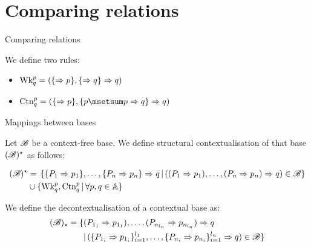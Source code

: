 \documentclass{beamer}
\begin{document}
\section{Comparing relations}
\begin{frame}{Comparing relations}
\begin{definition}
	We define two rules:
	\begin{itemize}
		\item $\text{Wk}^p_q = (\openaddrule \Rightarrow p\closeaddrule, \openaddrule \Rightarrow q \closeaddrule\Rightarrow q)$
		\item $\text{Ctn}^p_q = (\openaddrule \Rightarrow p \closeaddrule, \openaddrule p\msetsum p\Rightarrow q\closeaddrule\Rightarrow q)$
	\end{itemize}
\end{definition}
\end{frame}
\begin{frame}{Mappings between bases}
	\pause
	\begin{definition}
		Let $\baseB$ be a context-free base. We define structural contextualisation of that base $\iplill{\baseB}$ as follows: 
		\begin{minipage}{\textwidth}\scriptsize
		\begin{align*}
		\iplill{\baseB} &= \,\{ \openaddrule P_1\Rightarrow p_1\closeaddrule, \dots, \openaddrule P_n\Rightarrow p_n\closeaddrule\Rightarrow q \, | \, ((P_1\Rightarrow p_1), \dots, (P_n\Rightarrow p_n)\Rightarrow q) \in\baseB \}\\ 
		& \cup \{\text{Wk}^p_q, \text{Ctn}^p_q \,|\, \forall p, q \in \At\}
		\end{align*}
	\end{minipage}
	\end{definition}
	\pause
	We define the decontextualisation of a contextual base as:
	\begin{align*}
	\illipl{\baseB} = \{& (P_{1_1}\Rightarrow p_{1_{1}}),\dots,(P_{n_{l_n}}\Rightarrow p_{n_{l_n}})\Rightarrow q \\
	&|\, (\openaddrule P_{1_i}\Rightarrow p_{1_{i}}\Closeaddrule{i=1}{l_1},\dots,\openaddrule P_{n_i}\Rightarrow p_{n_{i}} \Closeaddrule{i=1}{l_n}\Rightarrow q) \in \baseB\}
	\end{align*}
\end{frame}
\end{document}
